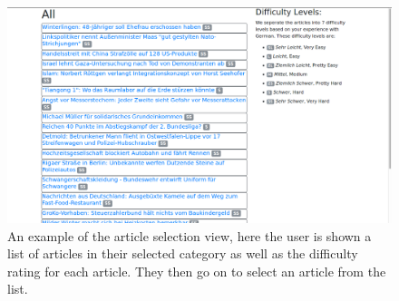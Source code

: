 \begin{figure}[H]
	\caption[Screenshot of the Article Selection View]{An example of the article selection view, here the user is shown a list of articles in their selected category as well as the difficulty rating for each article. They then go on to select an article from the list.}
	\label{fig:view2}
	\begin{center}
	\includegraphics[width=\textwidth]{Graphics/View2}
\end{center}
\end{figure}